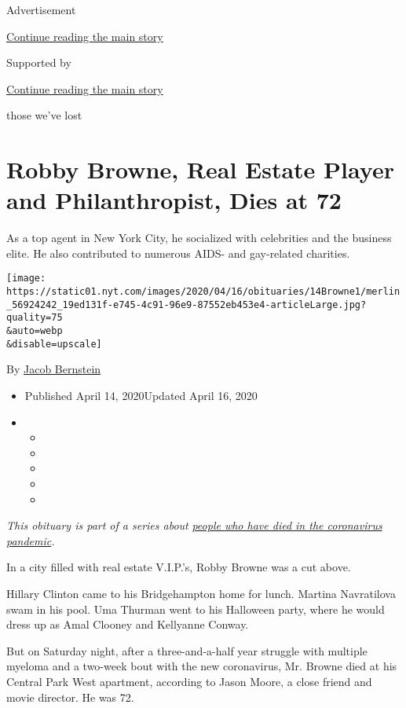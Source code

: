 Advertisement

\protect\hyperlink{after-top}{Continue reading the main story}

Supported by

\protect\hyperlink{after-sponsor}{Continue reading the main story}

those we've lost

\hypertarget{robby-browne-real-estate-player-and-philanthropist-dies-at-72}{%
\section{Robby Browne, Real Estate Player and Philanthropist, Dies at
72}\label{robby-browne-real-estate-player-and-philanthropist-dies-at-72}}

As a top agent in New York City, he socialized with celebrities and the
business elite. He also contributed to numerous AIDS- and gay-related
charities.

\texttt{[image: https://static01.nyt.com/images/2020/04/16/obituaries/14Browne1/merlin\_56924242\_19ed131f-e745-4c91-96e9-87552eb453e4-articleLarge.jpg?quality=75\\\&auto=webp\\\&disable=upscale]}

By \href{https://www.nytimes.com/by/jacob-bernstein}{Jacob Bernstein}

\begin{itemize}
\item
  Published April 14, 2020Updated April 16, 2020
\item
  \begin{itemize}
  \item
  \item
  \item
  \item
  \item
  \end{itemize}
\end{itemize}

\emph{This obituary is part of a series about}
\href{https://www.nytimes.com/series/people-who-have-died-of-the-coronavirus}{\emph{people
who have died in the coronavirus pandemic}}\emph{.}

In a city filled with real estate V.I.P.'s, Robby Browne was a cut
above.

Hillary Clinton came to his Bridgehampton home for lunch. Martina
Navratilova swam in his pool. Uma Thurman went to his Halloween party,
where he would dress up as Amal Clooney and Kellyanne Conway.

But on Saturday night, after a three-and-a-half year struggle with
multiple myeloma and a two-week bout with the new coronavirus, Mr.
Browne died at his Central Park West apartment, according to Jason
Moore, a close friend and movie director. He was 72.

